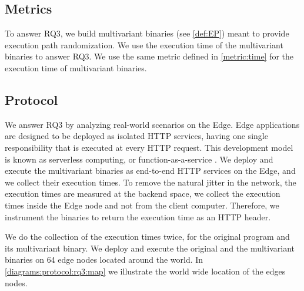 
\subsection*{Metrics}

To answer RQ3, we build multivariant \wasm binaries (see \autoref{def:EP}) meant to provide execution path randomization.
We use the execution time of the multivariant binaries to answer RQ3. We use the same metric defined in \autoref{metric:time} for the execution time of multivariant binaries.

\subsection*{Protocol}


We answer RQ3 by analyzing real-world scenarios on the Edge. 
Edge applications are designed to be deployed as isolated HTTP services, having one single responsibility that is executed at every HTTP request. This development model is known as serverless computing, or function-as-a-service \cite{shillaker2020faasm,Narayan2021Swivel}. 
We deploy and execute the multivariant binaries as end-to-end HTTP services on the Edge, and we collect their execution times.
To remove the natural jitter in the network, the execution times are measured at the backend space, \ie we collect the execution times inside the Edge node and not from the client computer. 
Therefore, we instrument the binaries to return the execution time as an HTTP header. 

We do the collection of the execution times twice, for the original program and its multivariant binary. We deploy and execute the original and the multivariant binaries on 64 edge nodes located around the world. In \autoref{diagrams:protocol:rq3:map} we illustrate the world wide location of the edges nodes.


